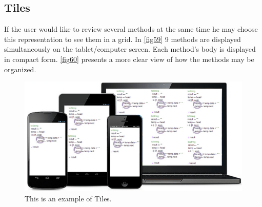 \subsection{Tiles}
If the user would like to review several methods at the same time he may choose this representation to see them in a grid. In \autoref{fig59} 9 methods are displayed simultaneously on the tablet/computer screen. Each method's body is displayed in compact form. \autoref{fig60} presents a more clear view of how the methods may be organized.
\begin{figure}[H]
\includegraphics{"./fig/Tiles"}
\caption{This is an example of Tiles.}
\label{fig59}
\end{figure}
